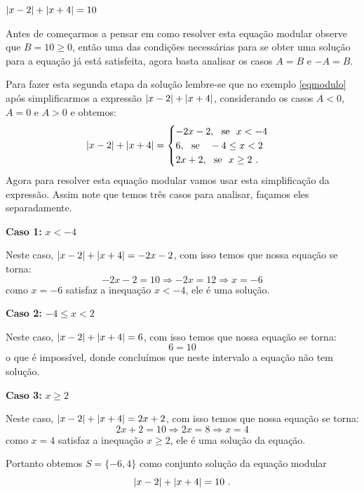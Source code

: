  \begin{exem}
    $\left|x-2\right| + \left|x+4\right|= 10$

   Antes de começarmos a pensar em como resolver esta equação modular observe que $B= 10 \geq 0$, então uma das condições necessárias para se obter uma solução para a equação já está satisfeita, agora basta analisar os casos $A= B$ e $-A= B$.

   Para fazer esta segunda etapa da solução lembre-se que no exemplo \autoref{eqmodulo} após simplificarmos a expressão $\left|x-2\right| + \left|x+4\right|$, considerando os casos $A< 0$, $A= 0$ e $A> 0$ e obtemos:
   \[ \left|x-2\right| + \left|x+4\right| = \begin{cases}
      -2x-2, \ \ \text{se} \ \ x < -4 \\
      6, \ \ \text{se } \ \ -4 \leq x < 2 \\
      2x + 2, \ \ \text{se} \ \ x \geq 2 \ .
     \end{cases}
  \]
 Agora para resolver esta equação modular vamos usar esta simplificação da expressão. Assim note que temos três casos para analisar, façamos eles separadamente.

 \textbf{Caso 1:} $x < -4$

 Neste caso, $\left|x-2\right| + \left|x+4\right|= -2x-2$, com isso temos que nossa equação se torna:
\begin{equation}
-2x-2= 10 \Rightarrow -2x= 12 \Rightarrow x= -6
\end{equation}
 como $x= -6$ satisfaz a inequação $x< -4$, ele é uma solução.

 \textbf{Caso 2:} $-4 \leq x < 2$

 Neste caso, $\left|x-2\right| + \left|x+4\right|= 6$, com isso temos que nossa equação se torna:
\begin{equation}
6= 10
\end{equation}
 o que é impossível, donde concluímos que neste intervalo a equação não tem solução.

 \textbf{Caso 3:} $x \geq 2 $

 Neste caso, $\left|x-2\right| + \left|x+4\right|= 2x + 2$, com isso temos que nossa equação se torna:
\begin{equation}
2x + 2= 10 \Rightarrow 2x= 8 \Rightarrow x= 4
\end{equation}
 como $x= 4$ satisfaz a inequação $x \geq 2$, ele é uma solução da equação.

 Portanto obtemos $S=\{-6, 4\}$ como conjunto solução da equação modular
\begin{equation}
\left|x-2\right| + \left|x+4\right|= 10 \ .
\end{equation}

 \end{exem}


